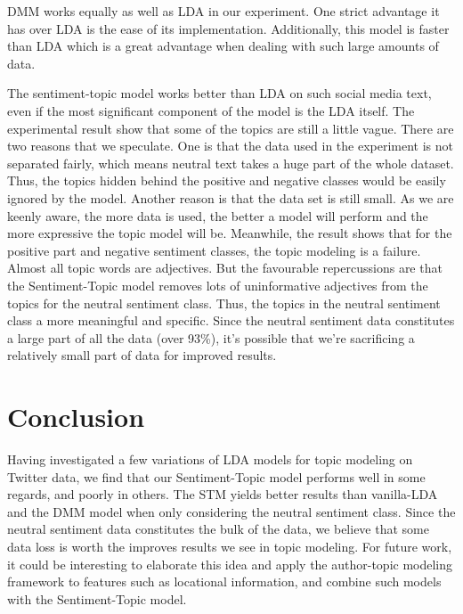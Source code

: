 \documentclass[12pt]{amsart}
\newcommand{\0}{\mat{0}}
\newcommand{\1}{\mathds{1}}
\begin{document}
DMM works equally as well as LDA in our experiment. One strict advantage it has over LDA is the ease of its implementation. Additionally, this model is faster than LDA which is a great advantage when dealing with such large amounts of data.

The sentiment-topic model works better than LDA on such social media text, even if the most significant component of the model is the LDA itself.  The experimental result show that some of the topics are still a little vague. There are two reasons that we speculate. One is that the data used in the experiment is not separated fairly, which means neutral text takes a huge part of the whole dataset. Thus, the topics hidden behind the positive and negative classes would be easily ignored by the model. Another reason is that the data set is still small. As we are keenly aware, the more data is used, the better a model will perform and the more expressive the topic model will be. Meanwhile, the result shows that for the positive part and negative sentiment classes, the topic modeling is a failure. Almost all topic words are adjectives. But the favourable repercussions are that the Sentiment-Topic model removes lots of uninformative adjectives from the topics for the neutral sentiment class. Thus, the topics in the neutral sentiment class a more meaningful and specific. Since the neutral sentiment data  constitutes a large part of all the data (over 93\%), it's possible that we're sacrificing a relatively small part of data for improved results.

\section{Conclusion}
Having investigated a few variations of LDA models for topic modeling on Twitter data, we find that our Sentiment-Topic model performs well in some regards, and poorly in others. The STM yields better results than vanilla-LDA and the DMM model when only considering the neutral sentiment class. Since the neutral sentiment data constitutes the bulk of the data, we believe that some data loss is worth the improves results we see in topic modeling. For future work, it could be interesting to elaborate this idea and apply the author-topic modeling framework to features such as locational information, and combine such models with the Sentiment-Topic model.
\end{document}

